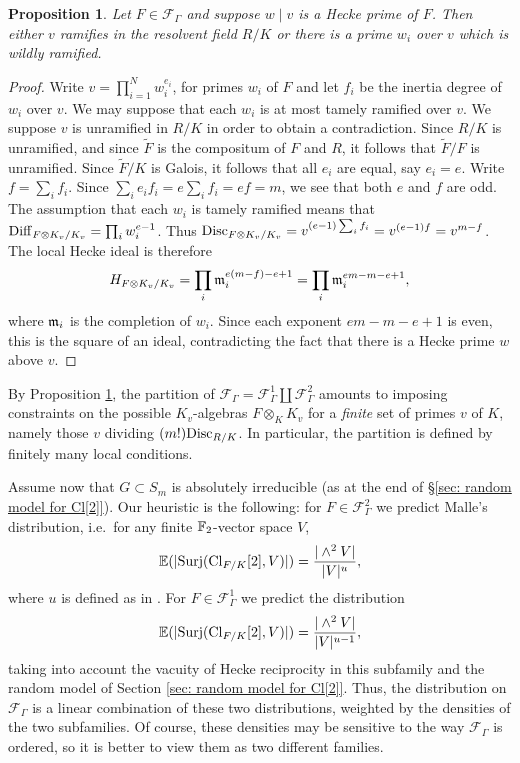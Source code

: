 \documentclass[11pt,a4paper]{amsart}
\def\F{{\rm \mathbb{F}}}
\def\m{{\rm \mathfrak{m}}}
\def\Cl{{\rm Cl}}
\def\Diff{{\rm Diff}}
\def\Disc{{\rm Disc}}
\numberwithin{equation}{section}
\newtheorem{proposition}[theorem]{Proposition}
\begin{document}
\begin{proposition}\label{prop: hecke primes divide the resolvent disc}
    Let $F \in \mathcal{F}_\Gamma$ and suppose $w \mid v$ is a Hecke prime of $F$. Then either $v$ ramifies in the resolvent field $R/K$ or there is a prime $w_i$ over $v$ which is wildly ramified. 
\end{proposition}
\begin{proof}
Write $v = \prod_{i = 1}^N w_i^{e_i}$, for primes $w_i$ of $F$ and let $f_i$ be the inertia degree of $w_i$ over $v$. We may suppose that each $w_i$ is at most tamely ramified over $v$. We suppose $v$ is unramified in $R/K$ in order to obtain a contradiction. Since $R/K$ is unramified, and since $\tilde F$ is the compositum of $F$ and $R$, it follows that $\tilde F/F$ is unramified. Since $\tilde F/K$ is Galois, it follows that all $e_i$ are equal, say $e_i = e$. Write $f = \sum_i f_i$. Since $\sum_i e_if_i = e \sum_i f_i = ef = m$, we see that both $e$ and $f$ are odd. The assumption that each $w_i$ is tamely ramified means that $\Diff_{F \otimes K_v/K_v} = \prod_i w_i^{e-1}$. Thus $\Disc_{F \otimes K_v/K_v} = v^{(e-1)\sum_i f_i} = v^{(e-1)f} = v^{m-f}$. The local Hecke ideal is therefore 
\[H_{F\otimes K_v /K_v} = \prod_i \m_i^{e(m-f) - e + 1} = \prod_i \m_i^{em - m -e +1},\]
where $\m_i$ is the completion of $w_i$.
Since each exponent $em-m-e+1$ is even, this is the square of an ideal, contradicting the fact that there is a Hecke prime $w$ above $v$.  
\end{proof}

By Proposition \ref{prop: hecke primes divide the resolvent disc}, the partition of $\mathcal{F}_\Gamma = \mathcal{F}_\Gamma^1 \coprod \mathcal{F}_\Gamma^2$ amounts to imposing constraints on the possible $K_v$-algebras $F \otimes_K K_v$ for a {\it finite} set of primes $v$ of $K$, namely those $v$ dividing $(m!)\Disc_{R/K}$. In particular, the partition is defined by finitely many local conditions. 


Assume now that $G \subset S_m$ is absolutely irreducible (as at the end of \S\ref{sec: random model for Cl[2]}).  Our heuristic is the following: for $F \in \mathcal{F}_\Gamma^2$ we predict Malle's distribution, i.e.\ for any finite $\F_2$-vector space $V$,
\begin{equation}\label{eq: malle moments II}
    \mathbb{E}(|\mathrm{Surj}(\Cl_{F/K}[2],V)|) = \dfrac{| \wedge^2 V|}{|V|^u},
\end{equation}
where $u$ is defined as in \cite{Malle2010}. For $F \in \mathcal{F}_\Gamma^1$ we predict the distribution
\begin{equation} \label{eqn: spin moments}
    \mathbb{E}(|\mathrm{Surj}(\Cl_{F/K}[2],V)|) = \dfrac{| \wedge^2 V|}{|V|^{u-1}},
\end{equation}
taking into account the vacuity of Hecke reciprocity in this subfamily and the random model of Section \ref{sec: random model for Cl[2]}. Thus, the distribution on  $\mathcal{F}_\Gamma$ is a linear combination of these two distributions, weighted by the densities of the two subfamilies. Of course, these densities may be sensitive to the way $\mathcal{F}_\Gamma$ is ordered, so it is better to view them as two different families.
\end{document}
